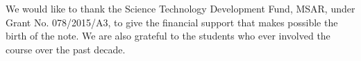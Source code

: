 %
%



We would like to thank the Science Technology Development Fund, MSAR, under Grant No. 078/2015/A3, to give the financial support that makes possible the birth of the note. We are also grateful to the students who ever involved the course over the past decade. 